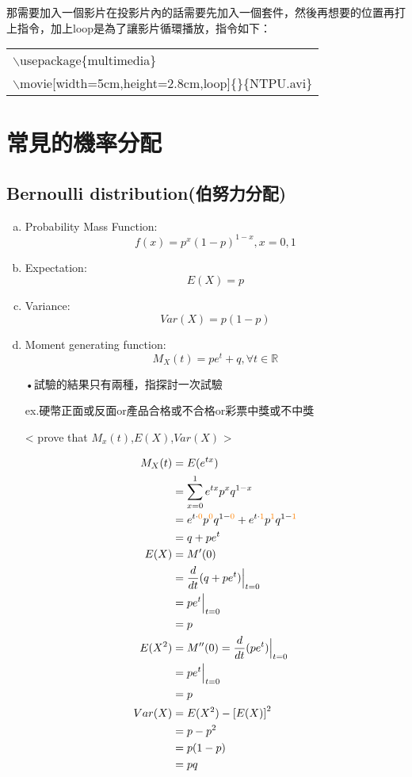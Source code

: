 \documentclass[12pt, a4paper]{article}
\begin{document}
那需要加入一個影片在投影片內的話需要先加入一個套件，然後再想要的位置再打上指令，加上loop是為了讓影片循環播放，指令如下：
\begin{center}\colorbox{slight}{\begin{tabular}{p{}}
    $\backslash$usepackage\{multimedia\}\\
    $\backslash$movie[width=5cm,height=2.8cm,loop]\{\}\{NTPU.avi\}
\end{tabular}}
\end{center}
\section{常見的機率分配}
\subsection{Bernoulli distribution(伯努力分配)}
\begin{enumerate}[(a)]

\item Probability Mass Function:$$f(x)=p^{x}(1-p)^{1-x},x=0,1$$

\item Expectation:$$E(X)=p$$

\item Variance:$$Var(X)=p(1-p)$$

\item Moment generating function:$$M_{X}(t)=pe^{t}+q,\forall t\in \mathbb{R}$$

•試驗的結果只有兩種，指探討一次試驗

ex.硬幣正面或反面or產品合格或不合格or彩票中獎或不中獎

< prove that $M_{x}(t)$,$E(X)$,$Var(X)$ >

\begin{align*}
M_{X}(t) &= E(e^{tx}) \\
         &= \sum_{\substack{x = 0 \\ }}^1 e^{tx}p^{x}q^{1-x} \\
         &= e^{t\cdot\textcolor{orange}{0}}p^{\textcolor{orange}{0}}q^{1-\textcolor{orange}{0}}+e^{t\cdot\textcolor{orange}{1}}p^{\textcolor{orange}{1}}q^{1-\textcolor{orange}{1}} \\
         &= q+pe^{t} \\
E(X)     &= M'(0) \\
         &= \frac{d}{dt}(q+pe^{t})\Big|_{t=0}\\
         &=pe^{t}\Big|_{t=0}\\
         &=p\\
E(X^2)   &=M''(0)=\frac{d}{dt}(pe^{t})\Big|_{t=0}\\
         &=pe^{t}\Big|_{t=0}\\
         &=p\\
Var(X)   &=E(X^2)-\left[E(X)\right]^2\\
         &=p-p^2\\
         &=p(1-p)\\
         &=pq
\end{align*}
\end{enumerate}
\end{document}
